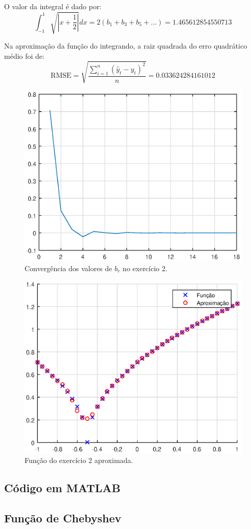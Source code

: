 \documentclass[10pt,a4paper]{article}
\begin{document}
    O valor da integral é dado por:
    	\[\int_{-1}^1 \sqrt{\left|x+\frac{1}{2}\right|} dx = 2\left(b_1+b_3+b_5+\dots\right)=1.465612854550713\]
        
        Na aproximação da função do integrando, a raiz quadrada do erro quadrático médio foi de:
       \[\mbox{RMSE} = \sqrt{\frac{\sum_{i=1}^n\left(\hat{y}_t-y_t\right)^2}{n}} = 0.033624284161012\]
    
    \begin{figure}
    \centering
      \includegraphics[width=0.8\linewidth]{figures/f2.eps}
      \caption{Convergência dos valores de $b_r$ no exercício 2.}
      \label{fig:f2br}
	\end{figure}
    
    \begin{figure}
    \centering
      \includegraphics[width=0.8\linewidth]{figures/ap2.eps}
      \caption{Função do exercício 2 aproximada.}
      \label{fig:ap2br}
	\end{figure}
    
    \newpage
    \subsection{Código em MATLAB}
    
    \subsection{Função de Chebyshev}
    
    
\end{document}
